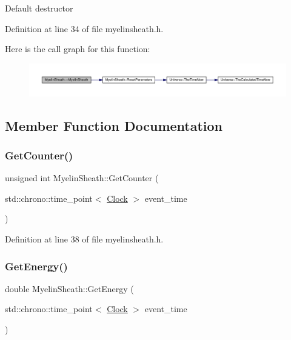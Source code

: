Default destructor 

Definition at line 34 of file myelinsheath.\+h.

Here is the call graph for this function\+:\nopagebreak
\begin{figure}[H]
\begin{center}
\leavevmode
\includegraphics[width=350pt]{class_myelin_sheath_acf71a2a450e2df353f28eed6c7a4129a_cgraph}
\end{center}
\end{figure}


\subsection{Member Function Documentation}
\mbox{\label{class_myelin_sheath_a10eef8601d129e7e2f28e8ed1ebc975c}} 
\subsubsection{\texorpdfstring{Get\+Counter()}{GetCounter()}}
{\footnotesize\ttfamily unsigned int Myelin\+Sheath\+::\+Get\+Counter (\begin{DoxyParamCaption}\item[{std\+::chrono\+::time\+\_\+point$<$ \hyperlink{universe_8h_a0ef8d951d1ca5ab3cfaf7ab4c7a6fd80}{Clock} $>$}]{event\+\_\+time }\end{DoxyParamCaption})\hspace{0.3cm}{\ttfamily [inline]}}



Definition at line 38 of file myelinsheath.\+h.

\mbox{\label{class_myelin_sheath_ac0c4142b6066e5982c54583e8ac01271}} 
\subsubsection{\texorpdfstring{Get\+Energy()}{GetEnergy()}}
{\footnotesize\ttfamily double Myelin\+Sheath\+::\+Get\+Energy (\begin{DoxyParamCaption}\item[{std\+::chrono\+::time\+\_\+point$<$ \hyperlink{universe_8h_a0ef8d951d1ca5ab3cfaf7ab4c7a6fd80}{Clock} $>$}]{event\+\_\+time }\end{DoxyParamCaption})\hspace{0.3cm}{\ttfamily [inline]}}



